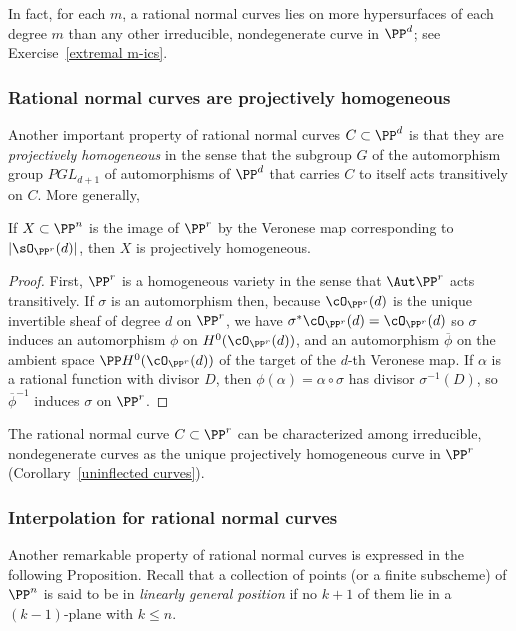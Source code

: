 In fact, for each $m$, a rational normal curves lies on more hypersurfaces of each degree $m$ than any other irreducible, nondegenerate curve in $\PP^d$; see Exercise~\ref{extremal m-ics}. 

\subsubsection{Rational normal curves are projectively homogeneous}

Another important property of rational normal curves $C \subset \PP^d$ is that they are \emph{projectively homogeneous} in the sense that the subgroup $G$ of the automorphism group $PGL_{d+1}$ of automorphisms of $\PP^d$ that carries $C$ to itself acts transitively on $C$. More generally,

\begin{proposition}\label{Veronese is projectively homogeneous}
If $X\subset \PP^n$ is the image of $\PP^r$ by the Veronese map corresponding to $|\sO_{\PP^r}(d)|$, then $X$ is projectively homogeneous.
\end{proposition}
\begin{proof}
First, $\PP^r$ is a homogeneous variety in the sense that $\Aut \PP^r$ acts transitively. If $\sigma$ is an automorphism then,
 because $\cO_{\PP^r}(d)$ is the unique
invertible sheaf of degree $d$ on $\PP^r$,  we have $\sigma^*\cO_{\PP^r}(d) = \cO_{\PP^r}(d)$ so $\sigma$ induces an automorphism $\phi$ on $H^0(\cO_{\PP^r}(d))$, and an automorphism $\overline \phi$ on the ambient space $\PP H^0(\cO_{\PP^r}(d))$ of the target of the $d$-th Veronese map. If $\alpha$
is a rational function with divisor $D$, then $\phi(\alpha) = \alpha\circ \sigma$ has divisor $\sigma^{-1}(D)$, so $\overline\phi^{-1}$ induces $\sigma$ on $\PP^r$. 
\end{proof}

The rational normal curve $C \subset \PP^r$ can  be characterized among irreducible, nondegenerate curves as the unique projectively homogeneous curve in $\PP^r$ (Corollary~\ref{uninflected curves}).

\subsubsection{Interpolation for rational normal curves}

Another remarkable property of rational normal curves is expressed in the following Proposition. Recall that a collection of points (or a finite subscheme)
of $\PP^n$ is said to be in \emph{linearly general position} if no $k+1$ of them lie in a $(k-1)$-plane with $k\leq n$. 

